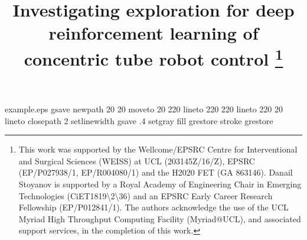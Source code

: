 %
%
%
%
%
\begin{filecontents*}{example.eps}
gsave
newpath
  20 20 moveto
  20 220 lineto
  220 220 lineto
  220 20 lineto
closepath
2 setlinewidth
gsave
  .4 setgray fill
grestore
stroke
grestore
\end{filecontents*}
%
\RequirePackage{fix-cm}
%
\documentclass{svjour3}                     %
%
\smartqed  %
%
\usepackage{graphicx}
%
%
\usepackage{amsmath}
\usepackage{subfig}

%
%
%


\title{Investigating exploration for deep reinforcement learning of concentric tube robot control
\thanks{This work was supported by the Wellcome/EPSRC Centre for Interventional and Surgical Sciences (WEISS) at UCL (203145Z/16/Z), EPSRC (EP/P027938/1, EP/R004080/1) and the H2020 FET (GA 863146). Danail Stoyanov is supported by a Royal Academy of Engineering Chair in Emerging Technologies (CiET1819\textbackslash2\textbackslash 36) and an EPSRC Early Career Research Fellowship (EP/P012841/1). The authors acknowledge the use of the UCL Myriad High Throughput Computing Facility (Myriad@UCL), and associated support services, in the completion of this work.}
}

